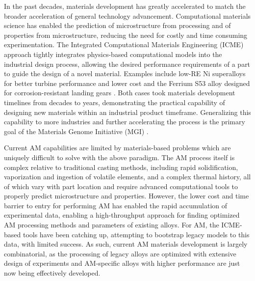 In the past decades, materials development has greatly accelerated to match the broader acceleration of general technology advancement. Computational materials science has enabled the prediction of microstructure from processing and of properties from microstructure, reducing the need for costly and time consuming experimentation. The Integrated Computational Materials Engineering (ICME) approach tightly integrates physics-based computational models into the industrial design process, allowing the desired performance requirements of a part to guide the design of a novel material. Examples include low-RE Ni superalloys for better turbine performance \cite{Pollock2016} and lower cost and the Ferrium S53 alloy designed for corrosion-resistant landing gears \cite{Olson2014}. Both cases took materials development timelines from decades to years, demonstrating the practical capability of designing new materials within an industrial product timeframe. Generalizing this capability to more industries and further accelerating the process is the primary goal of the Materials Genome Initiative (MGI) \cite{MGI}.

Current AM capabilities are limited by materials-based problems which are uniquely difficult to solve with the above paradigm. The AM process itself is complex relative to traditional casting methods, including rapid solidification, vaporization and ingestion of volatile elements, and a complex thermal history, all of which vary with part location and require advanced computational tools to properly predict microstructure and properties. However, the lower cost and time barrier to entry for performing AM has enabled the rapid accumulation of experimental data, enabling a high-throughput approach for finding optimized AM processing methods and parameters of existing alloys. For AM, the ICME-based tools have been catching up, attempting to bootstrap legacy models to this data, with limited success. As such, current AM materials development is largely combinatorial, as the processing of legacy alloys are optimized with extensive design of experiments and AM-specific alloys with higher performance are just now being effectively developed.

